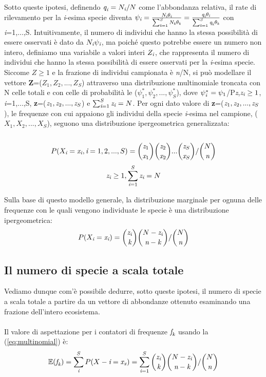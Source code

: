 Sotto queste ipotesi, definendo $\emph{q}_\emph{i}=N_\emph{i}/N $ come l'abbondanza relativa, il rate di rilevamento per la \emph{i}-esima specie diventa $\psi_{\emph{i}}=\frac{N_\emph{i}\theta_\emph{i}}{\sum_{\emph{k}=1}^S N_\emph{k}\theta_\emph{k}}=\frac{\emph{q}_\emph{i}\theta_\emph{i}}{\sum_{\emph{k}=1}^S \emph{q}_\emph{k}\theta_\emph{k}}$ con \emph{i}=1,...,S.
Intuitivamente, il numero di individui che hanno la stessa possibilità di essere osservati è dato da $N_\emph{i}\psi_\emph{i}$, ma poiché questo potrebbe essere un numero non intero, definiamo una variabile a valori interi $Z_\emph{i}$, che rappresenta il numero di individui che hanno la stessa possibilità di essere osservati per la \emph{i}-esima specie. Siccome $Z\ge 1$ e la frazione di individui campionata è \emph{n}/N, si può modellare il vettore \textbf{Z}=($Z_1,Z_2,...,Z_S$) attraverso una distribuzione multinomiale troncata con N celle totali e con celle di probabilità le ($\psi_1^*,\psi_2^*,...,\psi_S^*$), dove $\psi_\emph{i}^*=\psi_1$/P{\emph{z},$\emph{z}_\emph{i} \ge 1 $, \emph{i}=1,...,S}, \textbf{z}=($\emph{z}_1 , \emph{z}_2,...,\emph{z}_S$) e $\sum_{\emph{i}=1}^S \emph{z}_\emph{i}=N$. Per ogni dato valore di \textbf{z}=($\emph{z}_1 , \emph{z}_2,...,\emph{z}_S$), le frequenze con cui appaiono gli individui della specie \emph{i}-esima nel campione, ($X_1,X_2,...,X_S$), seguono una distribuzione ipergeometrica generalizzata:
\\ \\
\begin{equation}
    P(X_\emph{i}=\emph{x}_\emph{i}, \emph{i}=1,2,...,S)=\binom{\emph{z}_1}{\emph{x}_1}\binom{\emph{z}_2}{\emph{x}_2}...\binom{\emph{z}_S}{\emph{x}_S}/\binom{N}{\emph{n}}
\end{equation}
$$ \emph{z}_\emph{i}\ge 1, \sum_{\emph{i}=1}^S \emph{z}_\emph{i}=N$$

Sulla base di questo modello generale, la distribuzione marginale per ognuna delle frequenze con le quali vengono individuate le specie è una distribuzione ipergeometrica:
\begin{equation}
P(X_\emph{i}=\emph{x}_\emph{i})=\binom{\emph{z}_\emph{i}}{\emph{k}}\binom{N-\emph{z}_\emph{i}}{\emph{n}-\emph{k}}/\binom{N}{\emph{n}}
\label{eq:multinomial}
\end{equation}

\subsection{Il numero di specie a scala totale}
Vediamo dunque com'è possibile dedurre, sotto queste ipotesi, il numero di specie a scala totale a partire da un vettore di abbondanze ottenuto esaminando una frazione dell'intero ecosistema.\\ \\
Il valore di aspettazione per i contatori di frequenze $\emph{f}_\emph{k}$ usando la (\ref{eq:multinomial}) è:
\begin{equation}
    \mathbb{E}(\emph{f}_\emph{k})=\sum_\emph{i}^S P(X-\emph{i}=\emph{x}_\emph{x})= \sum_{\emph{i}=1}^S \binom{\emph{z}_\emph{i}}{\emph{k}}\binom{N-\emph{z}_\emph{i}}{\emph{n}-\emph{k}}/\binom{N}{\emph{n}}
    \label{eq:expectationvalue}
\end{equation}

